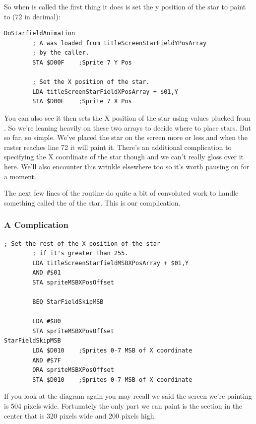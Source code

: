 So when  is called the first thing it does is set the y position of the star to paint
to  (72 in decimal): 

\begin{lstlisting}[caption=The start of \icode{DoStarfieldAnimation} responsible for painting stars.]
DoStarfieldAnimation   
        ; A was loaded from titleScreenStarFieldYPosArray
        ; by the caller.
        STA $D00F    ;Sprite 7 Y Pos

        ; Set the X position of the star.
        LDA titleScreenStarFieldXPosArray + $01,Y
        STA $D00E    ;Sprite 7 X Pos

\end{lstlisting}

You can also see it then sets the X position of the star using values plucked from .
So we're leaning heavily on these two arrays to decide where to place stars. But so far, so simple. We've placed the star
on the screen more or less and when the raster reaches line 72 it will paint it. There's an additional complication to 
specifying the X coordinate of the star though and we can't really gloss over it here. We'll also encounter this
wrinkle elsewhere too so it's worth pausing on for a moment.

The next few lines of the routine do quite a bit of convoluted work to handle something called the  of the
star. This is our complication. 

\subsubsection{A Complication}
\begin{lstlisting}[caption= MSBXPos.. some'it.]
        ; Set the rest of the X position of the star
        ; if it's greater than 255.
        LDA titleScreenStarfieldMSBXPosArray + $01,Y
        AND #$01
        STA spriteMSBXPosOffset

        BEQ StarFieldSkipMSB

        LDA #$80
        STA spriteMSBXPosOffset
StarFieldSkipMSB   
        LDA $D010    ;Sprites 0-7 MSB of X coordinate
        AND #$7F
        ORA spriteMSBXPosOffset
        STA $D010    ;Sprites 0-7 MSB of X coordinate

\end{lstlisting}

If you look at the diagram again you may recall we said the screen we're painting is 504 pixels wide. Fortunately the only 
part we can paint is the section in the center that is 320 pixels wide and 200 pixels high. 


